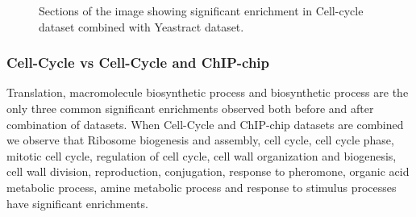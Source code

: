 \begin{figure}[p]
\centering
{}
\caption{Sections of the image showing significant enrichment in Cell-cycle dataset combined with Yeastract dataset.}
\label{fig:maxent_ccycle_yt_enrich}
\end{figure}

\subsubsection{Cell-Cycle vs Cell-Cycle and ChIP-chip}
Translation, macromolecule biosynthetic process and biosynthetic process are the only three common significant enrichments observed 
both before and after combination of datasets. When Cell-Cycle and ChIP-chip datasets are combined we observe that Ribosome biogenesis and assembly, cell cycle, cell cycle phase, mitotic cell cycle, regulation of 
cell cycle, cell wall organization and biogenesis, cell wall division, reproduction, conjugation, response to pheromone, organic 
acid metabolic process, amine metabolic process and response to stimulus processes have significant enrichments. 

